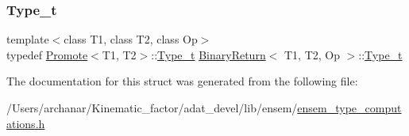 \mbox{\label{structBinaryReturn_a77ba8984fbe3ead3c145da225432d208}} 
\subsubsection{\texorpdfstring{Type\_t}{Type\_t}\hspace{0.1cm}{\footnotesize\ttfamily [2/2]}}
{\footnotesize\ttfamily template$<$class T1, class T2, class Op$>$ \\
typedef \mbox{\hyperlink{structPromote}{Promote}}$<$T1, T2$>$\+::\mbox{\hyperlink{structBinaryReturn_a77ba8984fbe3ead3c145da225432d208}{Type\+\_\+t}} \mbox{\hyperlink{structBinaryReturn}{Binary\+Return}}$<$ T1, T2, Op $>$\+::\mbox{\hyperlink{structBinaryReturn_a77ba8984fbe3ead3c145da225432d208}{Type\+\_\+t}}}



The documentation for this struct was generated from the following file\+:\begin{DoxyCompactItemize}
\item 
/\+Users/archanar/\+Kinematic\+\_\+factor/adat\+\_\+devel/lib/ensem/\mbox{\hyperlink{lib_2ensem_2ensem__type__computations_8h}{ensem\+\_\+type\+\_\+computations.\+h}}\end{DoxyCompactItemize}
